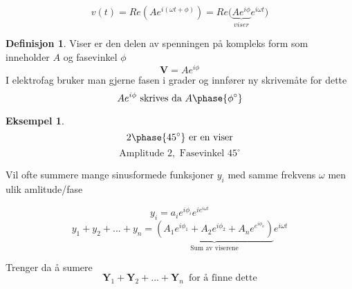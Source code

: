 \documentclass[11pt]{article}
\theoremstyle{definition}
\newtheorem{mindef}{Definisjon}[section]
\newenvironment{fmindef}
{\begin{mdframed}[style=minstil]\begin{mindef}}
		{\end{mindef}\end{mdframed}}
\theoremstyle{definition}
\newtheorem{mitteks}{Eksempel}[section]
\newenvironment{fmitteks}
{\begin{mdframed}[style=minstil]\begin{mitteks}}
		{\end{mitteks}\end{mdframed}}
\theoremstyle{definition}
\theoremstyle{definition}
\theoremstyle{definition}
\theoremstyle{definition}
\begin{document}
		\[v(t)=Re\left( Ae^{i(\omega t+\phi)} \right)=Re\Big( \underbrace{Ae^{i\phi}}_{viser}e^{i\omega t} \Big)  \] 
		
		\begin{fmindef}
			Viser er den delen av spenningen på kompleks form som inneholder \(A\) og fasevinkel \(\phi \) 
			\[\textbf{V}=Ae^{i\phi}\]
			I elektrofag bruker man gjerne fasen i grader og innfører ny skrivemåte for dette 
			\[Ae^{i\phi}\text{ skrives da } A\phase{\phi^{\circ}} \]
		\end{fmindef}
		
		\begin{fmitteks}
			\[2\phase{45^{\circ}} \text{ er en viser} \]
			\[\text{Amplitude }2, \text{   Fasevinkel }45^{\circ}\]
		\end{fmitteks}
		
		\newpage
		
		Vil ofte summere mange sinusformede funksjoner \(y_i\) med samme frekvens \(\omega \) men ulik amlitude/fase
		
		\[y_i=a_ie^{i\phi_i}e^{ie^{i\omega t}}\]
		\[y_1+y_2+...+y_n=\underbrace{(A_1e^{i\phi_1}+A_2e^{i\phi_2}+A_ne^{e^{i\phi_n}})}_{\text{Sum av viserene}}e^{i\omega t} \]
		
		Trenger da å sumere
		\[ \textbf{Y}_1+\textbf{Y}_2+...+\textbf{Y}_n \,\,\, \text{for å finne dette}\]
		
\end{document}

